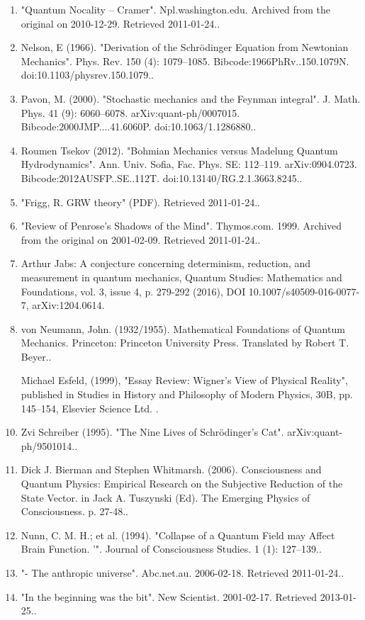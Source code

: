 \begin{enumerate}
\item "Quantum Nocality – Cramer". Npl.washington.edu. Archived from the original on 2010-12-29. Retrieved 2011-01-24..
\item Nelson, E (1966). "Derivation of the Schrödinger Equation from Newtonian Mechanics". Phys. Rev. 150 (4): 1079–1085. Bibcode:1966PhRv..150.1079N. doi:10.1103/physrev.150.1079..
\item Pavon, M. (2000). "Stochastic mechanics and the Feynman integral". J. Math. Phys. 41 (9): 6060–6078. arXiv:quant-ph/0007015. Bibcode:2000JMP....41.6060P. doi:10.1063/1.1286880..
\item Roumen Tsekov (2012). "Bohmian Mechanics versus Madelung Quantum Hydrodynamics". Ann. Univ. Sofia, Fac. Phys. SE: 112–119. arXiv:0904.0723. Bibcode:2012AUSFP..SE..112T. doi:10.13140/RG.2.1.3663.8245..
\item "Frigg, R. GRW theory" (PDF). Retrieved 2011-01-24..
\item "Review of Penrose's Shadows of the Mind". Thymos.com. 1999. Archived from the original on 2001-02-09. Retrieved 2011-01-24..
\item Arthur Jabs: A conjecture concerning determinism, reduction, and measurement in quantum mechanics, Quantum Studies: Mathematics and Foundations, vol. 3, issue 4, p. 279-292 (2016), DOI 10.1007/s40509-016-0077-7, arXiv:1204.0614.
\item von Neumann, John. (1932/1955). Mathematical Foundations of Quantum Mechanics. Princeton: Princeton University Press. Translated by Robert T. Beyer..
\item [Michael Esfeld, (1999), "Essay Review: Wigner's View of Physical Reality", published in Studies in History and Philosophy of Modern Physics, 30B, pp. 145–154, Elsevier Science Ltd.].
\item Zvi Schreiber (1995). "The Nine Lives of Schrödinger's Cat". arXiv:quant-ph/9501014..
\item Dick J. Bierman and Stephen Whitmarsh. (2006). Consciousness and Quantum Physics: Empirical Research on the Subjective Reduction of the State Vector. in Jack A. Tuszynski (Ed). The Emerging Physics of Consciousness. p. 27-48..
\item Nunn, C. M. H.; et al. (1994). "Collapse of a Quantum Field may Affect Brain Function. '". Journal of Consciousness Studies. 1 (1): 127–139..
\item "- The anthropic universe". Abc.net.au. 2006-02-18. Retrieved 2011-01-24..
\item "In the beginning was the bit". New Scientist. 2001-02-17. Retrieved 2013-01-25..

\end{enumerate}
